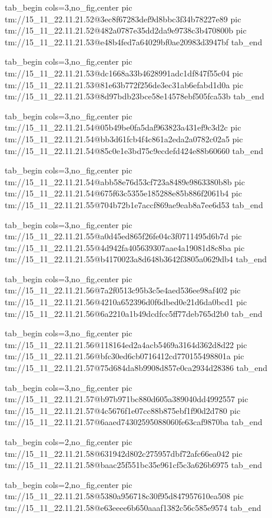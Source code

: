  
 
 
 
 

\qqSecCmtScr


\ifcmt
  tab_begin cols=3,no_fig,center
    pic tm://15_11_22.11.21.52@3ec8f67283def9d8bbc3f34b78227e89
    pic tm://15_11_22.11.21.52@482a0787e35dd2da9e9738c3b470800b
    pic tm://15_11_22.11.21.53@e48b4fed7a64029bf0ae20983d3947bf
  tab_end
\fi


\ifcmt
  tab_begin cols=3,no_fig,center
    pic tm://15_11_22.11.21.53@dc1668a33b4628991adc1df847f55c04
    pic tm://15_11_22.11.21.53@81e63b772f256de3ec31ab6efabd1d0a
    pic tm://15_11_22.11.21.53@8d97bdb23bce58e14578ebf505fca53b
  tab_end
\fi


\ifcmt
  tab_begin cols=3,no_fig,center
    pic tm://15_11_22.11.21.54@05b49be0fa5daf963823a431ef9c3d2c
    pic tm://15_11_22.11.21.54@bb3d61fcb4f4c861a2eda2a0782c02a5
    pic tm://15_11_22.11.21.54@85c0e1e3bd75c9ecdefd424e88b60660
  tab_end
\fi


\ifcmt
  tab_begin cols=3,no_fig,center
    pic tm://15_11_22.11.21.54@abb58e76d53cf723a8489e9863380b8b
    pic tm://15_11_22.11.21.54@675f63c5355e185288e85b886f2061b4
    pic tm://15_11_22.11.21.55@704b72b1e7accf869ae9eab8a7ee6d53
  tab_end
\fi


\ifcmt
  tab_begin cols=3,no_fig,center
    pic tm://15_11_22.11.21.55@a0d45ed865f26fe04c3f0711495d6b7d
    pic tm://15_11_22.11.21.55@4d942fa405639307aae4a19081d8c8ba
    pic tm://15_11_22.11.21.55@b4170023a8d648b3642f3805a0629db4
  tab_end
\fi


\ifcmt
  tab_begin cols=3,no_fig,center
    pic tm://15_11_22.11.21.56@7a2f0513c95b3c5e4aed536ee98af402
    pic tm://15_11_22.11.21.56@4210a652396d0f6dbed0e21d6da0bcd1
    pic tm://15_11_22.11.21.56@6a2210a1b49dcdfcc5ff77deb765d2b0
  tab_end
\fi


\ifcmt
  tab_begin cols=3,no_fig,center
    pic tm://15_11_22.11.21.56@118164ed2a4acb5469a3164d362d8d22
    pic tm://15_11_22.11.21.56@bfc30ed6cb0716412cd770155498801a
    pic tm://15_11_22.11.21.57@75d684da8b9908d857e0ca2934d28386
  tab_end
\fi


\ifcmt
  tab_begin cols=3,no_fig,center
    pic tm://15_11_22.11.21.57@b97b971bc880d605a389040dd4992557
    pic tm://15_11_22.11.21.57@4c5676f1e07cc88b875ebf1f90d2d780
    pic tm://15_11_22.11.21.57@6aaed74302595088060fe63caf9870ba
  tab_end
\fi


\ifcmt
  tab_begin cols=2,no_fig,center
    pic tm://15_11_22.11.21.58@631942d802c275957dbf72afc66ea042
    pic tm://15_11_22.11.21.58@baac25f551bc35e961cf5c3a626b6975
  tab_end
\fi


\ifcmt
  tab_begin cols=2,no_fig,center
    pic tm://15_11_22.11.21.58@5380a956718c30f95d847957610ea508
    pic tm://15_11_22.11.21.58@e63eeee6b650aaaf1382c56c585e9574
  tab_end
\fi

